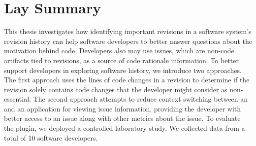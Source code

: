 

\chapter{Lay Summary}

This thesis investigates how identifying important revisions in a software system's revision history can help 
software developers to better answer questions about the motivation behind code.
Developers also may use issues, which are non-code artifacts tied to revisions, 
as a source of code rationale information.
To better support developers in exploring software history, 
we introduce  two approaches.
The first approach uses the lines of code changes in a revision
to determine if the revision solely contains code changes that the developer
might consider as non-essential.
The second approach attempts to reduce context switching between an 
and an application for viewing issue information, providing the developer with
better access to an issue along with other metrics about the issue.
To evaluate the plugin, we deployed a controlled laboratory study.
We collected data from a total of 10 software developers.